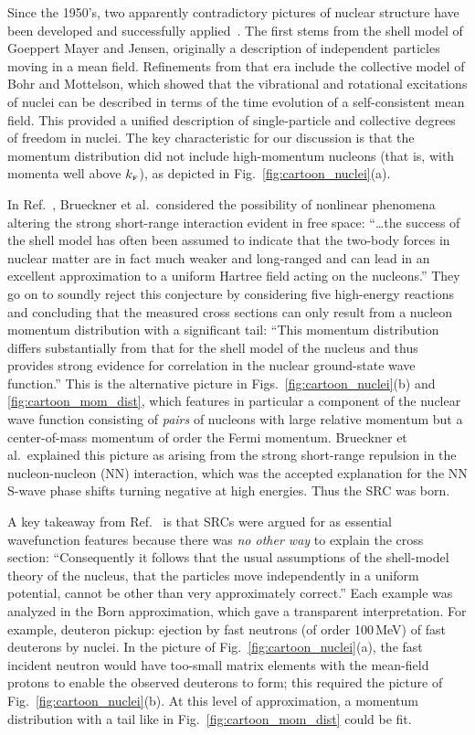 \documentclass[10pt,aps,prc,floatfix,twocolumn,nofootinbib]{revtex4-1}
\begin{document}
Since the 1950's, two apparently contradictory pictures of nuclear structure have been developed and successfully applied~\cite{preston1975structure}.
The first stems from the shell model of Goeppert Mayer and Jensen, originally a description of independent particles moving in a mean field.
Refinements from that era include the collective model of Bohr and Mottelson, which showed that the
vibrational and rotational excitations of nuclei can be described in terms of the time evolution of a self-consistent mean field.
This provided a unified description of single-particle and collective degrees of freedom in nuclei.
The key characteristic for our discussion is that the momentum distribution did not include high-momentum nucleons (that is, with momenta well above $k_{\scriptscriptstyle{\text F}}$), as depicted in Fig.~\ref{fig:cartoon_nuclei}(a).

In Ref.~\cite{Brueckner:1955zzd}, Brueckner et al.\ considered the possibility of nonlinear phenomena altering the strong short-range interaction evident in free space: ``\ldots the success of the shell model has often been assumed to indicate that the two-body forces in nuclear matter are in fact much weaker and long-ranged and can lead in an excellent approximation to a uniform Hartree field acting on the nucleons.''
They go on to soundly reject this conjecture by considering five high-energy reactions and concluding that the measured cross sections can only result from a nucleon momentum distribution with a significant tail: ``This momentum distribution differs substantially from that for the shell model of the nucleus and thus provides strong evidence for correlation in the nuclear ground-state wave function.''
This is the alternative picture in Figs.~\ref{fig:cartoon_nuclei}(b) and \ref{fig:cartoon_mom_dist}, which features in particular a component of the nuclear wave function consisting of \emph{pairs} of nucleons with large relative momentum but a center-of-mass momentum of order the Fermi momentum.
Brueckner et al.\ explained this picture as arising from the strong short-range repulsion in the nucleon-nucleon (NN) interaction, which was the accepted explanation for the NN S-wave phase shifts turning negative at high energies.
Thus the SRC was born.

A key takeaway from Ref.~\cite{Brueckner:1955zzd} is that SRCs were argued for as essential wavefunction features because there was \emph{no other way} to explain the cross section: 
``Consequently it follows that the usual assumptions of the shell-model theory of the nucleus, that the particles move independently in a uniform potential, cannot be other than very approximately correct.''
Each example was analyzed in the Born approximation, which gave a transparent interpretation.
For example, deuteron pickup: ejection by fast neutrons (of order 100\,MeV) of fast deuterons by nuclei.
In the picture of Fig.~\ref{fig:cartoon_nuclei}(a), the fast incident neutron would have too-small matrix elements with the mean-field protons to enable the observed deuterons to form; this required the picture of Fig.~\ref{fig:cartoon_nuclei}(b).
At this level of approximation, a momentum distribution with a tail like in Fig.~\ref{fig:cartoon_mom_dist} could be fit.
\end{document}
